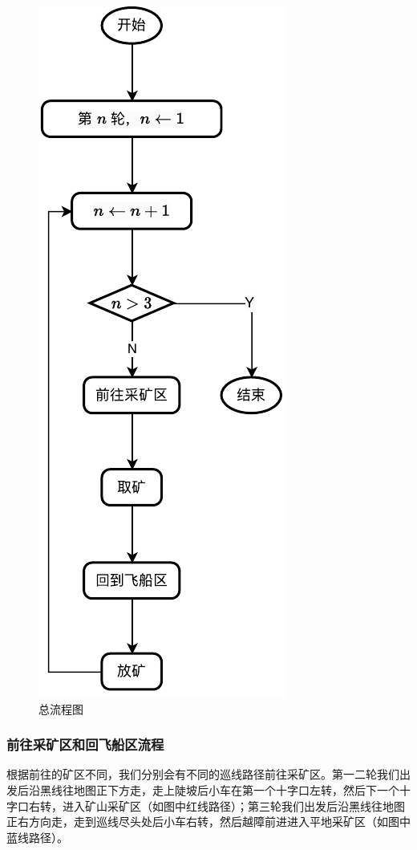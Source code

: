 \documentclass[10pt]{ctexart}
\begin{document}
\begin{figure} %
    \centering
    \includegraphics{algo/main_flow.pdf}
    \caption{总流程图}
    \label{fig:main_flow}
\end{figure}


\subsubsection{前往采矿区和回飞船区流程}
根据前往的矿区不同，我们分别会有不同的巡线路径前往采矿区。第一二轮我们出发后沿黑线往地图正下方走，走上陡坡后小车在第一个十字口左转，然后下一个十字口右转，进入矿山采矿区（如图中红线路径）；第三轮我们出发后沿黑线往地图正右方向走，走到巡线尽头处后小车右转，然后越障前进进入平地采矿区（如图中蓝线路径）。
\end{document}
